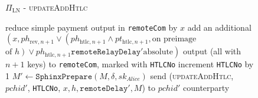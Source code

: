 \begin{figure}[H]
\begin{protocolbox}{$\Pi_{\mathrm{LN}}$ - \textsc{updateAddHtlc}}
\begin{algorithmic}[1]
            \State reduce simple payment output in \texttt{remoteCom} by $x$
            \State add an additional $\left(x, ph_{\mathrm{rev}, n+1} \vee
            \left(ph_{\mathrm{htlc}, n+1} \wedge pt_{\mathrm{htlc}, n+1}, \text{
            on preimage}\right.\right.$ $\left.\left.\text{of } h\right) \vee
            ph_{\mathrm{htlc}, n+1}\mathtt{remoteRelayDelay}' \text{
            absolute}\right)$ output (all with $n+1$ keys) to
            \texttt{remoteCom}, marked with \texttt{HTLCNo}
            \State increment \texttt{HTLCNo} by 1
            \State $M' \gets \mathtt{SphinxPrepare}\left(M, \delta,
            sk_{\mathit{Alice}}\right)$
            \State send (\textsc{updateAddHtlc}, $\mathit{pchid}'$,
            \texttt{HTLCNo}, $x, h, \mathtt{remoteDelay}', M$) to
            $\mathit{pchid}'$ counterparty
          \EndIf
        \EndIndent
      \end{algorithmic}
    \end{protocolbox}
    \caption{}
    \label{alg:protocol:pay:updateAddHtlc}
  \end{figure}

